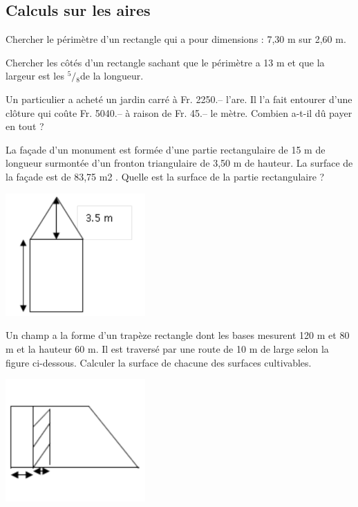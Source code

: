 \subsection{Calculs sur les aires}

\begin{exercice}
Chercher le périmètre d'un rectangle qui a pour dimensions : 7,30 m sur 2,60 m. 
\end{exercice}

\begin{exercice}
Chercher les côtés d'un rectangle sachant que le périmètre a 13 m et que la largeur est les ${}^{5}/{}_{8}$de la longueur.
\end{exercice}

\begin{exercice}
Un particulier a acheté un jardin carré à Fr. 2250.– l'are. Il l'a fait entourer d'une clôture qui coûte Fr. 5040.– à raison de Fr. 45.– le mètre. Combien a-t-il dû payer en tout ?
\end{exercice}

\begin{exercice}
La façade d’un monument est formée d’une partie rectangulaire de 15 m de longueur surmontée d’un fronton triangulaire de 3,50 m de hauteur. La surface de la façade est de 83,75 m2 .
Quelle est la surface de la partie rectangulaire ?
\begin{center}
\includegraphics[width= 0.4\textwidth]{volume/image/ex4.png}
\end{center}
\end{exercice}

\begin{exercice}
Un champ a la forme d’un trapèze rectangle dont les bases mesurent 120 m et 80 m et  la hauteur 60 m. Il est traversé par une route de 10 m de large selon la figure ci-dessous. Calculer la surface de chacune des surfaces cultivables.
\begin{center}
\includegraphics[width= 0.4\textwidth]{volume/image/ex5.png}
\end{center}
\end{exercice}

